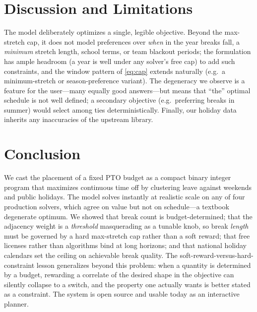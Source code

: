 \documentclass[10pt,twocolumn]{article}
\begin{document}
\section{Discussion and Limitations}

The model deliberately optimizes a single, legible objective. Beyond the
max-stretch cap, it does not model preferences over \emph{when} in the year
breaks fall, a \emph{minimum} stretch length, school terms, or team blackout
periods; the formulation has ample headroom (a year is well under any solver's
free cap) to add such constraints, and the window pattern of \eqref{eq:cap}
extends naturally (e.g.\ a minimum-stretch or season-preference variant). The
degeneracy we observe is a feature for the user---many equally good answers---but
means that ``the'' optimal schedule is not well defined; a secondary objective
(e.g.\ preferring breaks in summer) would select among ties deterministically.
Finally, our holiday data inherits any inaccuracies of the upstream library.

\section{Conclusion}

We cast the placement of a fixed PTO budget as a compact binary integer program
that maximizes continuous time off by clustering leave against weekends and
public holidays. The model solves instantly at realistic scale on any of four
production solvers, which agree on value but not on schedule---a textbook
degenerate optimum. We showed that break count is budget-determined; that the
adjacency weight is a \emph{threshold} masquerading as a tunable knob, so break
\emph{length} must be governed by a hard max-stretch cap rather than a soft
reward; that free licenses rather than algorithms bind at long horizons; and
that national holiday calendars set the ceiling on achievable break quality. The
soft-reward-versus-hard-constraint lesson generalizes beyond this problem: when
a quantity is determined by a budget, rewarding a correlate of the desired shape
in the objective can silently collapse to a switch, and the property one
actually wants is better stated as a constraint. The system is open source and
usable today as an interactive planner.



\end{document}
